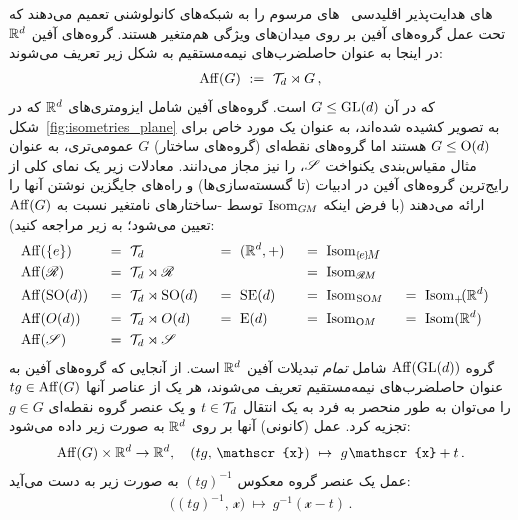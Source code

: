 های هدایت‌پذیر اقلیدسی~\cite{Cohen2017-STEER,3d_steerableCNNs,Weiler2019_E2CNN} های مرسوم را به شبکه‌های کانولوشنی تعمیم می‌دهند که تحت عمل گروه‌های آفین بر روی میدان‌های ویژگی هم‌متغیر هستند.
گروه‌های آفین $\mathbb{R}^d$ در اینجا به عنوان حاصلضرب‌های نیمه‌مستقیم به شکل زیر تعریف می‌شوند:
\begin{align}\label{eq:AffG_def}
	\operatorname{Aff}(G)\ :=\ \mathcal{T}_d \rtimes G \,,
\end{align}
که در آن $G\leq\operatorname{GL}(d)$ است.
گروه‌های آفین شامل ایزومتری‌های $\mathbb{R}^d$ که در شکل~\ref{fig:isometries_plane} به تصویر کشیده شده‌اند، به عنوان یک مورد خاص برای $G\leq \operatorname{O}(d)$ هستند اما گروه‌های نقطه‌ای (گروه‌های ساختار) $G$ عمومی‌تری، به عنوان مثال مقیاس‌بندی یکنواخت $\mathscr{S}$، را نیز مجاز می‌دانند.
معادلات زیر یک نمای کلی از رایج‌ترین گروه‌های آفین در ادبیات (تا گسسته‌سازی‌ها) و راه‌های جایگزین نوشتن آنها را ارائه می‌دهند (با فرض اینکه $\operatorname{Isom}_{G\mkern-1.4muM}$ توسط -ساختارهای نامتغیر نسبت به $\operatorname{Aff}(G)$ تعیین می‌شود؛ به زیر مراجعه کنید):
\begin{alignat}{5}
	&\Aff(\{e\}) \ &&=\ \Trans_d               \ &&=\ (\R^d,+)\ &&=\ \IsomeM \notag \\
	&\Aff(\Flip) \ &&=\ \Trans_d \rtimes \Flip   &&                \ &&=\ \IsomRM \notag \\
	&\Aff(\SO{d})\ &&=\ \Trans_d \rtimes \SO{d} \ &&=\ \SE{d}  \ &&=\ \IsomSOM\ &&=\ \Isom_+\!(\R^d) \\
	&\Aff(O(d)) \ &&=\ \Trans_d \rtimes O(d)  \ &&=\  \E{d}  \ &&=\ \IsomOM \ &&=\ \Isom(\R^d) \notag \\
	&\Aff(\Scale)\ &&=\ \Trans_d \rtimes \Scale \notag
\end{alignat}
گروه $\operatorname{Aff}(\operatorname{GL}(d))$ شامل \emph{تمام} تبدیلات آفین $\mathbb{R}^d$ است.
از آنجایی که گروه‌های آفین به عنوان حاصلضرب‌های نیمه‌مستقیم تعریف می‌شوند، هر یک از عناصر آنها $tg \in \operatorname{Aff}(G)$ را می‌توان به طور منحصر به فرد به یک انتقال $t\in \mathcal{T}_d$ و یک عنصر گروه نقطه‌ای $g\in G$ تجزیه کرد.
عمل (کانونی) آنها بر روی $\mathbb{R}^d$ به صورت زیر داده می‌شود:
\begin{align}
	\Aff(G)\times\R^d \to \R^d, \quad (tg,\, \mathscr{x})\ \mapsto\ g\mkern1mu \mathscr{x} + t \,.
\end{align}
عمل یک عنصر گروه معکوس $(tg)^{-1}$ به صورت زیر به دست می‌آید:
\begin{align}
	\big( (tg)^{-1},\, \mathscr{x}\big)\ \mapsto\ g^{-1} (\mathscr{x} - t) \,.
\end{align}


